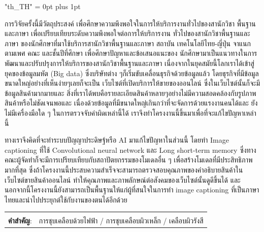 {
\XeTeXlinebreaklocale "th_TH"
\XeTeXlinebreakskip = 0pt plus 1pt
\thaifont
\thaiabstract

การวิจัยครั้งนี้มีวัตถุประสงค์  เพื่อศึกษาความพึงพอใจในการให้บริการงานทั่วไปของสานักวิชา พื้นฐานและภาษา เพื่อเปรียบเทียบระดับความพึงพอใจต่อการให้บริการงาน ทั่วไปของสานักวิชาพื้นฐานและภาษา ของนักศึกษาที่มาใช้บริการสานักวิชาพื้นฐานและภาษา สถาบัน เทคโนโลยีไทย-ญี่ปุ่น จาแนกตามเพศ คณะ และชั้นปีที่ศึกษา เพื่อศึกษาปัญหาและข้อเสนอแนะของ นักศึกษามาเป็นแนวทางในการพัฒนาและปรับปรุงการให้บริการของสานักวิชาพื้นฐานและภาษา
เนื่องจากในยุคสมัยนี้โลกเราได้เข้าสู่ยุคของข้อมูลมหัต (Big data) ซึ่งบริษัทต่าง ๆก็เริ่มขับเคลื่อนธุรกิจด้วยข้อมูลแล้ว  โดยธุรกิจที่มีข้อมูลขนาดใหญ่อย่างที่เห็นง่ายๆเลยก็จะเป็น เว็บไซต์ที่เปิดบริการให้ขายของออนไลน์ ซึ่งในเว็บไซต์นั้นก็จะมีข้อมูลสินค้ามากมายและ สิ่งที่เราได้พบคือรายละเอียดสินค้าหลายๆอย่างไม่มีความสอดคล้องกับรูปภาพสินค้าหรือไม่ชัดเจนพอและ เนื่องด้วยข้อมูลที่มีขนาดใหญ่เกินกว่าที่จะจัดการด้วยแรงงานคนได้และ ยังไม่มีเครื่องมือใด ๆ ในการตรวจจับคำผิดเหล่านี้ได้ เราจึงทำโครงงานนี้ขึ้นมาเพื่อที่จะแก้ไขปัญหาเหล่านี้\par
ทางเราจึงคิดที่จะทำระบบปัญญาประดิษฐ์หรือ AI มาแก้ไขปัญหาในส่วนนี้ โดยทำ Image captioning ที่ใช้ Convolutional neural network และ Long short-term memory ซึ่งทางคณะผู้จัดทำก็จะมีการเปรียบเทียบกับสถาปัตยกรรมของโมเดลอื่น ๆ เพื่อสร้างโมเดลที่มีประสิทธิภาพมากที่สุด ซึ่งถ้าโครงงานนี้ประสบความสำเร็จจะสามารถตรวจสอบคุณภาพของคำอธิบายสินค้าในเว็บไซต์ขายสินค้าออนไลน์ ทำให้คุณภาพและภาพลักษณ์ต่อสังคมของเว็บไซต์นั้นดูดีขึ้นได้ และนอกจากนี้โครงงานนี้ยังสามารถเป็นพื้นฐานให้แก่ผู้ที่สนใจในการทำ image captioning ที่เป็นภาษาไทยและนำไปประยุกต์ใช้กับงานของตนได้อีกด้วย

\begin{flushleft}
\begin{tabular*}{\textwidth}{@{}lp{}}
 & \\
\textbf{คำสำคัญ}: & การชุบเคลือบด้วยไฟฟ้า / การชุบเคลือบผิวเหล็ก /  เคลือบผิวรังสี
\end{tabular*}
\end{flushleft}
\endabstract
}
